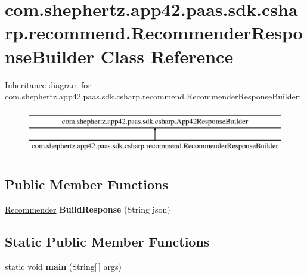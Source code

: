 \hypertarget{classcom_1_1shephertz_1_1app42_1_1paas_1_1sdk_1_1csharp_1_1recommend_1_1_recommender_response_builder}{\section{com.\+shephertz.\+app42.\+paas.\+sdk.\+csharp.\+recommend.\+Recommender\+Response\+Builder Class Reference}
\label{classcom_1_1shephertz_1_1app42_1_1paas_1_1sdk_1_1csharp_1_1recommend_1_1_recommender_response_builder}
}
Inheritance diagram for com.\+shephertz.\+app42.\+paas.\+sdk.\+csharp.\+recommend.\+Recommender\+Response\+Builder\+:\begin{figure}[H]
\begin{center}
\leavevmode
\includegraphics[height=2.000000cm]{classcom_1_1shephertz_1_1app42_1_1paas_1_1sdk_1_1csharp_1_1recommend_1_1_recommender_response_builder}
\end{center}
\end{figure}
\subsection*{Public Member Functions}
\begin{DoxyCompactItemize}
\item 
\hypertarget{classcom_1_1shephertz_1_1app42_1_1paas_1_1sdk_1_1csharp_1_1recommend_1_1_recommender_response_builder_aeb3581f28b14ffb1a695be8129b31a83}{\hyperlink{classcom_1_1shephertz_1_1app42_1_1paas_1_1sdk_1_1csharp_1_1recommend_1_1_recommender}{Recommender} {\bfseries Build\+Response} (String json)}\label{classcom_1_1shephertz_1_1app42_1_1paas_1_1sdk_1_1csharp_1_1recommend_1_1_recommender_response_builder_aeb3581f28b14ffb1a695be8129b31a83}

\end{DoxyCompactItemize}
\subsection*{Static Public Member Functions}
\begin{DoxyCompactItemize}
\item 
\hypertarget{classcom_1_1shephertz_1_1app42_1_1paas_1_1sdk_1_1csharp_1_1recommend_1_1_recommender_response_builder_a216ffbb859143f0a2abc5a9d30461123}{static void {\bfseries main} (String\mbox{[}$\,$\mbox{]} args)}\label{classcom_1_1shephertz_1_1app42_1_1paas_1_1sdk_1_1csharp_1_1recommend_1_1_recommender_response_builder_a216ffbb859143f0a2abc5a9d30461123}

\end{DoxyCompactItemize}
